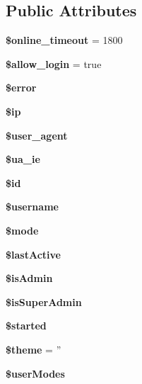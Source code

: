 \subsection*{Public Attributes}
\begin{CompactItemize}
\item 
{\bf \$online\_\-timeout} = 1800\label{classSession_7f138ce3aefc950369924f06d1260c63}

\item 
{\bf \$allow\_\-login} = true\label{classSession_3671a2369d19455ede5725b7523796bd}

\item 
{\bf \$error}\label{classSession_70739beac7af0b1169f95ce605b30a4e}

\item 
{\bf \$ip}\label{classSession_8780cfeaa847479c7913cdc4d8687f30}

\item 
{\bf \$user\_\-agent}\label{classSession_c9d6071b0b6e5d7954f9bece64b16868}

\item 
{\bf \$ua\_\-ie}\label{classSession_3a7e71b558b90b13bf913185efecaab6}

\item 
{\bf \$id}\label{classSession_0eee9a171bcea2297eaff32d171842ff}

\item 
{\bf \$username}\label{classSession_5fd453b192ce32bf2a4133778cbd8a79}

\item 
{\bf \$mode}\label{classSession_55d9bb73a6b28579e477aa028f610b03}

\item 
{\bf \$lastActive}\label{classSession_6de4c990c701fa1b9d2956540e03452c}

\item 
{\bf \$isAdmin}\label{classSession_891bcac9c79f249481cf757f435ee185}

\item 
{\bf \$isSuperAdmin}\label{classSession_b089cdbbb7513e605a5f84d363695b0f}

\item 
{\bf \$started}\label{classSession_0cd79bb7abe893bc9263e5e80870ee73}

\item 
{\bf \$theme} = ''\label{classSession_e3dba640365802e2e663fa5d87ccbaa0}

\item 
{\bf \$userModes}
\end{CompactItemize}


